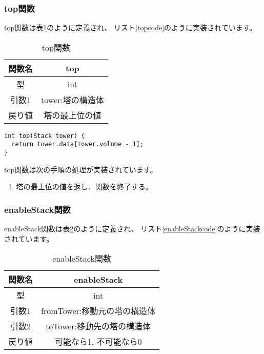 \documentclass[a4j]{jarticle}
\begin{document}
\subsubsection{top関数}
\label{sec:top}
top関数は表\ref{tb:top}のように定義され、
リスト\ref{topcode}のように実装されています。

\begin{table}[h]
  \centering
  \caption{top関数}
  \label{tb:top}
  \begin{tabular}{|c|c|}
    \hline
    関数名 & top         \\
    \hline
    型   & int         \\
    \hline
    引数1 & tower:塔の構造体 \\
    \hline
    戻り値 & 塔の最上位の値     \\
    \hline
  \end{tabular}
\end{table}


\begin{lstlisting}[caption=top関数,label=topcode]
int top(Stack tower) {
  return tower.data[tower.volume - 1];
}
\end{lstlisting}

top関数は次の手順の処理が実装されています。
\begin{enumerate}
  \item 塔の最上位の値を返し、関数を終了する。
\end{enumerate}

\subsubsection{enableStack関数}
\label{sec:enableStack}
enableStack関数は表\ref{tb:enableStack}のように定義され、
リスト\ref{enableStackcode}のように実装されています。

\begin{table}[h]
  \centering
  \caption{enableStack関数}
  \label{tb:enableStack}
  \begin{tabular}{|c|c|}
    \hline
    関数名 & enableStack         \\
    \hline
    型   & int                 \\
    \hline
    引数1 & fromTower:移動元の塔の構造体 \\
    \hline
    引数2 & toTower:移動先の塔の構造体   \\
    \hline
    戻り値 & 可能なら1, 不可能なら0       \\
    \hline
  \end{tabular}
\end{table}
\end{document}
